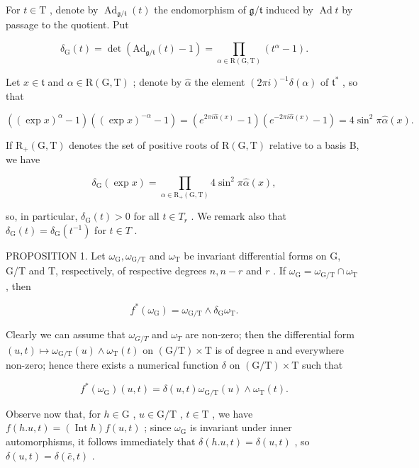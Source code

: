 For \(t \in \mathrm{T}\) , denote by \(\operatorname{Ad}_{\mathfrak{g} / \mathfrak{t}}(t)\) the endomorphism of \(\mathfrak{g} / \mathfrak{t}\) induced by \(\operatorname{Ad} t\) by passage to the quotient. Put

\[
\delta_ {\mathrm{G}} (t) = \det (\mathrm{Ad} _ {\mathfrak {g} / \mathfrak {t}} (t) - 1) = \prod_ {\alpha \in \mathrm{R} (\mathrm{G}, \mathrm{T})} (t ^ {\alpha} - 1).\tag{3}
\]

Let \(x \in \mathfrak{t}\) and \(\alpha \in \mathrm{R}(\mathrm{G},\mathrm{T})\) ; denote by \(\hat{\alpha}\) the element \((2\pi i)^{-1}\delta (\alpha)\) of \(\mathfrak{t}^*\) , so that

\[
((\exp x) ^ {\alpha} - 1) ((\exp x) ^ {- \alpha} - 1) = (e ^ {2 \pi i \hat {\alpha} (x)} - 1) (e ^ {- 2 \pi i \hat {\alpha} (x)} - 1) = 4 \sin^ {2} \pi \hat {\alpha} (x).
\]

If \(\mathrm{R}_{+}(\mathrm{G},\mathrm{T})\) denotes the set of positive roots of \(\mathrm{R}(\mathrm{G},\mathrm{T})\) relative to a basis B, we have

\[
\delta_ {\mathrm{G}} (\exp x) = \prod_ {\alpha \in \mathrm{R} _ {+} (\mathrm{G}, \mathrm{T})} 4 \sin^ {2} \pi \hat {\alpha} (x),
\]

so, in particular, \(\delta_{\mathrm{G}}(t)>0\) for all \(t\in T_{r}\) . We remark also that \(\delta_{\mathrm{G}}(t)=\delta_{\mathrm{G}}(t^{-1})\) for \(t\in T\) .

PROPOSITION 1. Let \(\omega_{\mathrm{G}}, \omega_{\mathrm{G/T}}\) and \(\omega_{\mathrm{T}}\) be invariant differential forms on G, G/T and T, respectively, of respective degrees \(n, n - r\) and \(r\) . If \(\omega_{\mathrm{G}} = \omega_{\mathrm{G/T}} \cap \omega_{\mathrm{T}}\) , then

\[
f ^ {*} (\omega_ {\mathrm{G}}) = \omega_ {\mathrm{G/T}} \wedge \delta_ {\mathrm{G}} \omega_ {\mathrm{T}}.
\]

Clearly we can assume that \(\omega_{G/T}\) and \(\omega_{T}\) are non-zero; then the differential form \((u,t)\mapsto\omega_{\mathrm{G/T}}(u)\wedge\omega_{\mathrm{T}}(t)\) on \((\mathrm{G/T})\times\mathrm{T}\) is of degree n and everywhere non-zero; hence there exists a numerical function \(\delta\) on \((\mathrm{G/T})\times\mathrm{T}\) such that

\[
f ^ {*} (\omega_ {\mathrm{G}}) (u, t) = \delta (u, t) \omega_ {\mathrm{G/T}} (u) \wedge \omega_ {\mathrm{T}} (t).
\]

Observe now that, for \(h \in \mathrm{G}\) , \(u \in \mathrm{G} / \mathrm{T}\) , \(t \in \mathrm{T}\) , we have \(f(h.u,t) = (\operatorname{Int} h)f(u,t)\) ; since \(\omega_{\mathrm{G}}\) is invariant under inner automorphisms, it follows immediately that \(\delta(h.u,t) = \delta(u,t)\) , so \(\delta(u,t) = \delta(\bar{e},t)\) .

